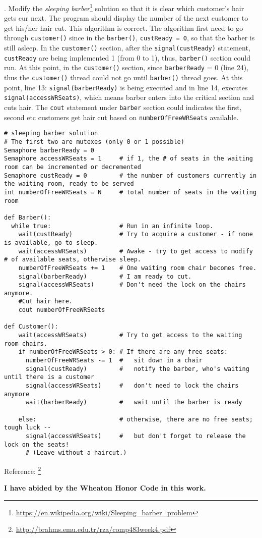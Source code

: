 \documentclass[12pt]{article}
\begin{document}
. Modify the \textit{sleeping barber}\footnote{\url{https://en.wikipedia.org/wiki/Sleeping_barber_problem}} solution so that it is clear which customer's hair gets cur next. The program should display the number of the next customer to get his/her hair cut.\hfill \break
\break
\noindent
This algorithm is correct. The algorithm first need to go through \texttt{customer()} since in the \texttt{barber()}, \texttt{custReady = 0}, so that the barber is still asleep. In the \texttt{customer()} section, after the \texttt{signal(custReady)} statement, \texttt{custReady} are being implemented 1 (from 0 to 1), thus, \texttt{barber()} section could run. At this point, in the \texttt{customer()} section, since \texttt{barberReady} = 0 (line 24), thus the \texttt{customer()} thread could not go until \texttt{barber()} thread goes. At this point, line 13: \texttt{signal(barberReady)} is being executed and in line 14, executes \texttt{signal(accessWRSeats)}, which means barber enters into the critical section and cuts hair.\hfill \break
The \texttt{cout} statement under \texttt{barber} section could indicates the first, second etc customers get hair cut based on \texttt{numberOfFreeWRSeats} available.

\begin{lstlisting}
# sleeping barber solution
# The first two are mutexes (only 0 or 1 possible)
Semaphore barberReady = 0
Semaphore accessWRSeats = 1     # if 1, the # of seats in the waiting room can be incremented or decremented
Semaphore custReady = 0         # the number of customers currently in the waiting room, ready to be served
int numberOfFreeWRSeats = N     # total number of seats in the waiting room

def Barber():
  while true:                   # Run in an infinite loop.
    wait(custReady)             # Try to acquire a customer - if none is available, go to sleep.
    wait(accessWRSeats)         # Awake - try to get access to modify # of available seats, otherwise sleep.
    numberOfFreeWRSeats += 1    # One waiting room chair becomes free.
    signal(barberReady)         # I am ready to cut.
    signal(accessWRSeats)       # Don't need the lock on the chairs anymore.
    #Cut hair here.
    cout numberOfFreeWRSeats

def Customer():
    wait(accessWRSeats)         # Try to get access to the waiting room chairs.
    if numberOfFreeWRSeats > 0: # If there are any free seats:
      numberOfFreeWRSeats -= 1  #   sit down in a chair
      signal(custReady)         #   notify the barber, who's waiting until there is a customer
      signal(accessWRSeats)     #   don't need to lock the chairs anymore
      wait(barberReady)         #   wait until the barber is ready
     
    else:                       # otherwise, there are no free seats; tough luck --
      signal(accessWRSeats)     #   but don't forget to release the lock on the seats!
      # (Leave without a haircut.)
\end{lstlisting}


\noindent
Reference:
\footnote{\url{http://brahms.emu.edu.tr/rza/comp483week4.pdf}}




\hfill \break
\hfill \break
\hfill \break
\hfill \break
\hfill \break
{\textbf{I have abided by the Wheaton Honor Code in this work.    }}\hfill \break

\end{document}
